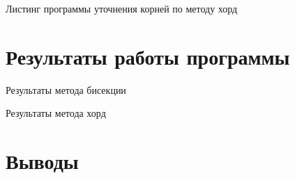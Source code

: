 Листинг программы уточнения корней по методу хорд
\lstset{inputencoding=utf8, extendedchars=\true}


\chapter{Результаты работы программы}

Результаты метода бисекции
\lstset{inputencoding=utf8, extendedchars=\true}


Результаты метода хорд
\lstset{inputencoding=utf8, extendedchars=\true}


\chapter*{Выводы}


